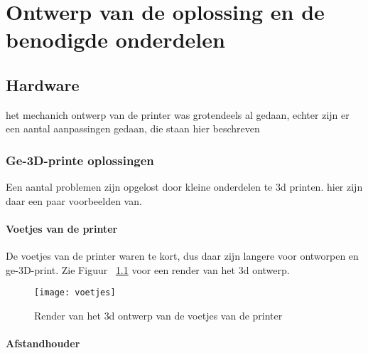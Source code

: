 \chapter{Ontwerp van de oplossing en de benodigde onderdelen}
\label{Ontwerp_van_de_oplossing_en_de_benodigde_onderdelen}

\section{Hardware}

het mechanich ontwerp van de printer was grotendeels al gedaan, echter zijn er een aantal aanpassingen gedaan, die staan hier beschreven

\subsection{Ge-3D-printe oplossingen}

Een aantal problemen zijn opgelost door kleine onderdelen te 3d printen. hier zijn
daar een paar voorbeelden van.

\subsubsection{Voetjes van de printer}

De voetjes van de printer waren te kort, dus daar zijn langere voor
ontworpen en ge-3D-print. Zie Figuur ~\ref{fig:voetjes} voor een render van
het \ac{3d} ontwerp.

\begin{figure}[h]
    \centerline{\texttt{[image: voetjes]}}
    \caption{Render van het \ac{3d} ontwerp van de voetjes van de printer}
    \label{fig:voetjes}
\end{figure}

\subsubsection{Afstandhouder}

